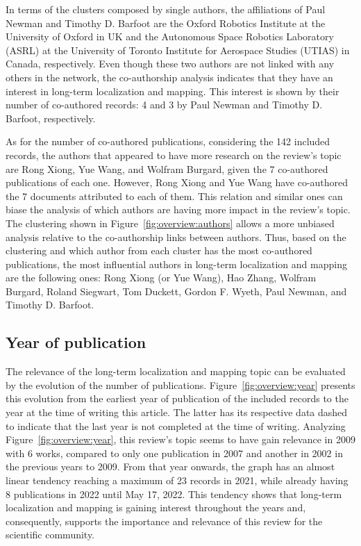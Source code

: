 In terms of the clusters composed by single authors, the affiliations of Paul Newman and Timothy D. Barfoot are the Oxford Robotics Institute at the University of Oxford in UK and the Autonomous Space Robotics Laboratory (ASRL) at the University of Toronto Institute for Aerospace Studies (UTIAS) in Canada, respectively. Even though these two authors are not linked with any others in the network, the co-authorship analysis indicates that they have an interest in long-term localization and mapping. This interest is shown by their number of co-authored records: 4 and 3 by Paul Newman and Timothy D. Barfoot, respectively.

As for the number of co-authored publications, considering the 142 included records, the authors that appeared to have more research on the review's topic are Rong Xiong, Yue Wang, and Wolfram Burgard, given the 7 co-authored publications of each one. However, Rong Xiong and Yue Wang have co-authored the 7 documents attributed to each of them. This relation and similar ones can biase the analysis of which authors are having more impact in the review's topic.
The clustering shown in Figure~\ref{fig:overview:authors} allows a more unbiased analysis relative to the co-authorship links between authors. Thus, based on the clustering and which author from each cluster has the most co-authored publications, the most influential authors in long-term localization and mapping are the following ones: Rong Xiong (or Yue Wang), Hao Zhang, Wolfram Burgard, Roland Siegwart, Tom Duckett, Gordon F. Wyeth, Paul Newman, and Timothy D. Barfoot.

\subsection{Year of publication}
\label{sec:overview:year}

The relevance of the long-term localization and mapping topic can be evaluated by the evolution of the number of publications. Figure~\ref{fig:overview:year} presents this evolution from the earliest year of publication of the included records to the year at the time of writing this article. The latter has its respective data dashed to indicate that the last year is not completed at the time of writing. Analyzing Figure~\ref{fig:overview:year}, this review's topic seems to have gain relevance in 2009 with 6 works, compared to only one publication in 2007 and another in 2002 in the previous years to 2009. From that year onwards, the graph has an almost linear tendency reaching a maximum of 23 records in 2021, while already having 8 publications in 2022 until May 17, 2022. This tendency shows that long-term localization and mapping is gaining interest throughout the years and, consequently, supports the importance and relevance of this review for the scientific community.


